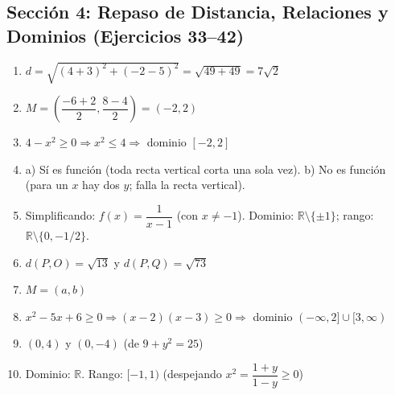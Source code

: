 \documentclass[12pt, letterpaper]{article}
\begin{document}
  \newpage


  \subsection*{Sección 4: Repaso de Distancia, Relaciones y Dominios (Ejercicios 33--42)}
  \begin{enumerate}[resume=respuestas, leftmargin=*, label=\textbf{\arabic*.}]
    \item $d = \sqrt{(4 + 3)^2 + (-2 - 5)^2} = \sqrt{49 + 49} = 7\sqrt{2}$
    \item $M = \left(\dfrac{-6 + 2}{2}, \dfrac{8 - 4}{2}\right) = (-2, 2)$
    \item $4 - x^2 \ge 0 \Rightarrow x^2 \le 4 \Rightarrow$ dominio $[-2, 2]$
    \item a) Sí es función (toda recta vertical corta una sola vez). \quad b) No es función (para un $x$ hay dos $y$; falla la recta vertical).
    \item Simplificando: $f(x) = \dfrac{1}{x - 1}$ (con $x \neq -1$). Dominio: $\mathbb{R} \setminus \{\pm 1\}$; \quad rango: $\mathbb{R} \setminus \{0, -1/2\}$.
    \item $d(P, O) = \sqrt{13}$ \quad y \quad $d(P, Q) = \sqrt{73}$
    \item $M = (a, b)$
    \item $x^2 - 5x + 6 \ge 0 \Rightarrow (x - 2)(x - 3) \ge 0 \Rightarrow$ dominio $(-\infty, 2] \cup [3, \infty)$
    \item $(0, 4)$ y $(0, -4)$ \quad (de $9 + y^2 = 25$)
    \item Dominio: $\mathbb{R}$. \quad Rango: $[-1, 1)$ (despejando $x^2 = \dfrac{1 + y}{1 - y} \ge 0$)
  \end{enumerate}
\end{document}
